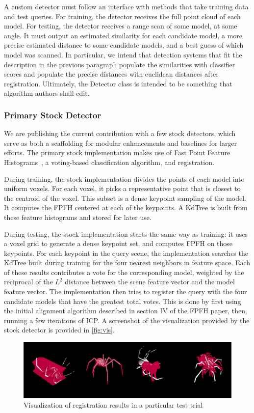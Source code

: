 A custom detector must follow an interface with methods that take training data and test queries.
For training, the detector receives the full point cloud of each model.
For testing, the detector receives a range scan of some model, at some angle. It must output an estimated similarity for each candidate model, a more precise estimated distance to some candidate models, and a best guess of which model was scanned.
In particular, we intend that detection systems that fit the description in the previous paragraph populate the similarities with classifier scores and populate the precise distances with euclidean distances after registration.
Ultimately, the Detector class is intended to be something that algorithm authors shall edit.

\subsubsection{Primary Stock Detector}
We are publishing the current contribution with a few stock detectors, which serve as both a scaffolding for modular enhancements and baselines for larger efforts.
The primary stock implementation makes use of Fast Point Feature Histograms~\cite{fpfh1, fpfh2}, a voting-based classification algorithm, and registration.

During training, the stock implementation divides the points of each model into uniform voxels. For each voxel, it picks a representative point that is closest to the centroid of the voxel. This subset is a dense keypoint sampling of the model. It computes the FPFH centered at each of the keypoints. A KdTree is built from these feature histograms and stored for later use.

During testing, the stock implementation starts the same way as training: it uses a voxel grid to generate a dense keypoint set, and computes FPFH on those keypoints.
For each keypoint in the query scene, the implementation searches the KdTree built during training for the four nearest neighbors in feature space. Each of these results contributes a vote for the corresponding model, weighted by the reciprocal of the $L^2$ distance between the scene feature vector and the model feature vector.
The implementation then tries to register the query with the four candidate models that have the greatest total votes.
This is done by first using the initial alignment algorithm described in section IV of the FPFH paper, then, running a few iterations of ICP.
A screenshot of the visualization provided by the stock detector is provided in \autoref{fig:vis}.
\begin{figure}[thpb]
  \centering
  \includegraphics[width=\columnwidth]{../figures/visualization.png}
  \caption{Visualization of registration results in a particular test trial}
  \label{fig:vis}
\end{figure}

